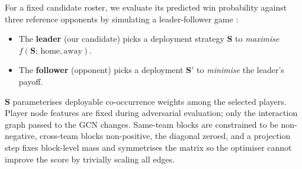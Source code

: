 \documentclass[12pt,letterpaper]{article}
\begin{document}
For a fixed candidate roster, we evaluate its predicted win probability
against three reference opponents by simulating a leader-follower game
\citep{conitzer2006commit}:

\begin{itemize}[leftmargin=*]
  \item The \textbf{leader} (our candidate) picks a deployment
    strategy $\mathbf{S}$ to \emph{maximise}
    $f(\mathbf{S};\,\text{home}, \text{away})$.
  \item The \textbf{follower} (opponent) picks a deployment
    $\mathbf{S}'$ to \emph{minimise} the leader's payoff.
\end{itemize}

$\mathbf{S}$ parameterises deployable co-occurrence weights among the
selected players.
Player node features are fixed during adversarial evaluation; only the
interaction graph passed to the GCN changes.
Same-team blocks are constrained to be non-negative, cross-team blocks
non-positive, the diagonal zeroed, and a projection step fixes
block-level mass and symmetrises the matrix so the optimiser cannot
improve the score by trivially scaling all edges.
\end{document}
